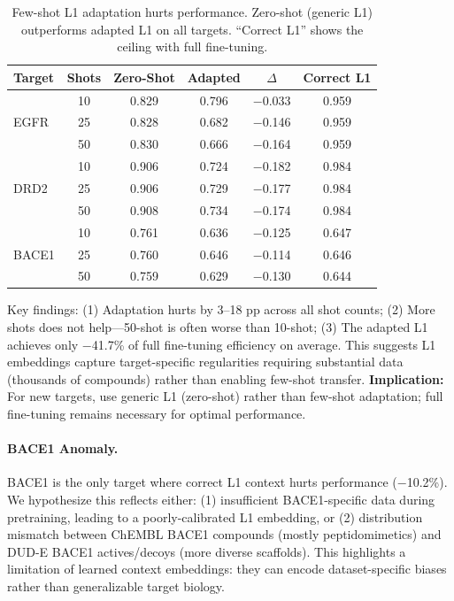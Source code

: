 \documentclass{article}
\begin{document}
\begin{table}[h]
\caption{Few-shot L1 adaptation hurts performance. Zero-shot (generic L1) outperforms adapted L1 on all targets. ``Correct L1'' shows the ceiling with full fine-tuning.}
\label{tab:fewshot}
\centering
\small
\begin{tabular}{@{}lccccc@{}}
\toprule
Target & Shots & Zero-Shot & Adapted & $\Delta$ & Correct L1 \\
\midrule
\multirow{3}{*}{EGFR} & 10 & 0.829 & 0.796 & $-$0.033 & 0.959 \\
 & 25 & 0.828 & 0.682 & $-$0.146 & 0.959 \\
 & 50 & 0.830 & 0.666 & $-$0.164 & 0.959 \\
\midrule
\multirow{3}{*}{DRD2} & 10 & 0.906 & 0.724 & $-$0.182 & 0.984 \\
 & 25 & 0.906 & 0.729 & $-$0.177 & 0.984 \\
 & 50 & 0.908 & 0.734 & $-$0.174 & 0.984 \\
\midrule
\multirow{3}{*}{BACE1} & 10 & 0.761 & 0.636 & $-$0.125 & 0.647 \\
 & 25 & 0.760 & 0.646 & $-$0.114 & 0.646 \\
 & 50 & 0.759 & 0.629 & $-$0.130 & 0.644 \\
\bottomrule
\end{tabular}
\end{table}

Key findings: (1) Adaptation hurts by 3--18 pp across all shot counts; (2) More shots does not help---50-shot is often worse than 10-shot; (3) The adapted L1 achieves only $-$41.7\% of full fine-tuning efficiency on average. This suggests L1 embeddings capture target-specific regularities requiring substantial data (thousands of compounds) rather than enabling few-shot transfer. \textbf{Implication:} For new targets, use generic L1 (zero-shot) rather than few-shot adaptation; full fine-tuning remains necessary for optimal performance.

\paragraph{BACE1 Anomaly.}
BACE1 is the only target where correct L1 context hurts performance ($-$10.2\%). We hypothesize this reflects either: (1) insufficient BACE1-specific data during pretraining, leading to a poorly-calibrated L1 embedding, or (2) distribution mismatch between ChEMBL BACE1 compounds (mostly peptidomimetics) and DUD-E BACE1 actives/decoys (more diverse scaffolds). This highlights a limitation of learned context embeddings: they can encode dataset-specific biases rather than generalizable target biology.
\end{document}
